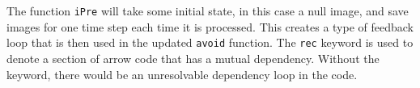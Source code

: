The function \texttt{iPre} will take some initial state, in this case a null image, and save images for one time step each time it is processed.
This creates a type of feedback loop that is then used in the updated \texttt{avoid} function.
The \texttt{rec} keyword is used to denote a section of arrow code that has a mutual dependency.
Without the keyword, there would be an unresolvable dependency loop in the code.



